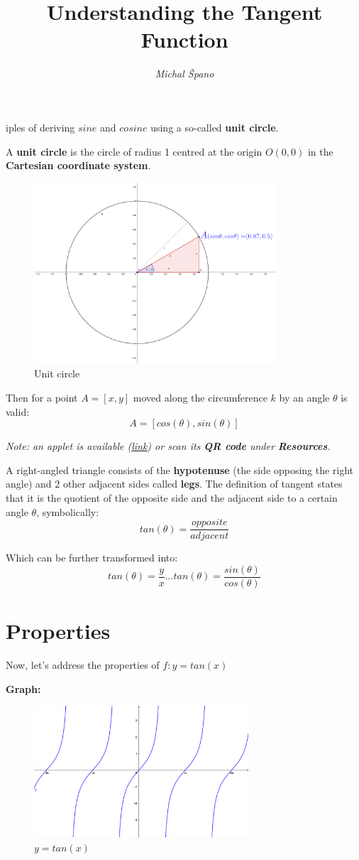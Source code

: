 \documentclass{article}
\title{\textbf{Understanding the Tangent Function}}
\author{\textit{Michal Špano}}
\date{}
\begin{document}
iples of deriving $sine$ and $cosine$ using a so-called \textbf{unit circle}.

A \textbf{unit circle} is the circle of radius 1 centred at the origin $O(0, 0)$ in the \textbf{Cartesian coordinate system}.

\begin{figure}[htp]
    \centering
    \includegraphics[width=9cm]{unit_circle.png}
    \caption{Unit circle}
\end{figure}

Then for a point $A = [x, y]$ moved along the circumference $k$ by an angle $\theta$ is valid:\\ 
\[  
A = \left[ cos(\theta), sin(\theta) \right]
\]

\textit{Note: an applet is available (\href{https://www.geogebra.org/m/gvtvjtpf}{link}) or scan its \textbf{QR code} under \textbf{Resources}}.

A right-angled triangle consists of the \textbf{hypotenuse} (the side opposing the right angle) and 2 other adjacent sides called \textbf{legs}. The definition of tangent states that it is the quotient of the opposite side and the adjacent side to a certain angle $\theta$, symbolically: 
\[
tan(\theta) = \frac{opposite}{adjacent}
\]

Which can be further transformed into: 
\[
tan(\theta) = \frac{y}{x} ... tan(\theta) = \frac{sin(\theta)}{cos(\theta)}
\]

\section{Properties}

Now, let's address the properties of $f:y=tan(x)$

\textbf{Graph: }

\begin{figure}[htp]
    \centering
    \includegraphics[width=8cm]{tan.png}
    \caption{$y=tan(x)$}
\end{figure}
\end{document}
